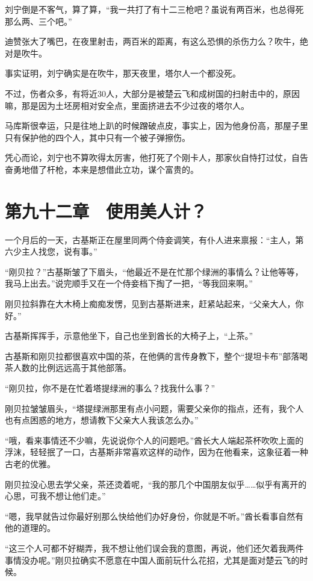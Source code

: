 刘宁倒是不客气，算了算，“我一共打了有十二三枪吧？虽说有两百米，也总得死那么两、三个吧。”

迪赞张大了嘴巴，在夜里射击，两百米的距离，有这么恐惧的杀伤力么？吹牛，绝对是吹牛。

事实证明，刘宁确实是在吹牛，那天夜里，塔尔人一个都没死。

不过，伤者众多，有将近30人，大部分是被楚云飞和成树国的扫射击中的，原因嘛，那是因为土坯房相对安全点，里面挤进去不少过夜的塔尔人。

马库斯很幸运，只是往地上趴的时候蹭破点皮，事实上，因为他身份高，那屋子里只有保护他的四个人，其中只有一个被子弹擦伤。

凭心而论，刘宁也不算吹得太厉害，他打死了个刚卡人，那家伙自恃打过仗，自告奋勇地借了杆枪，本来是想借此立功，谋个富贵的。

\section{第九十二章　使用美人计？}

一个月后的一天，古基斯正在屋里同两个侍妾调笑，有仆人进来禀报：“主人，第六少主人找您，说有事。”

“刚贝拉？”古基斯皱了下眉头，“他最近不是在忙那个绿洲的事情么？让他等等，我马上出去。”说完顺手又在一个侍妾档下掏了一把，“等我回来啊。”

刚贝拉斜靠在大木椅上痴痴发愣，见到古基斯进来，赶紧站起来，“父亲大人，你好。”

古基斯挥挥手，示意他坐下，自己也坐到酋长的大椅子上，“上茶。”

古基斯和刚贝拉都很喜欢中国的茶，在他俩的言传身教下，整个“提坦卡布”部落喝茶人数的比例远远高于其他部落。

“刚贝拉，你不是在忙着塔提绿洲的事么？找我什么事？”

刚贝拉皱皱眉头，“塔提绿洲那里有点小问题，需要父亲你的指点，还有，我个人也有点困惑的地方，想请教下父亲大人我该怎么办。”

“哦，看来事情还不少嘛，先说说你个人的问题吧。”酋长大人端起茶杯吹吹上面的浮沫，轻轻抿了一口，古基斯非常喜欢这样的动作，因为在他看来，这象征着一种古老的优雅。

刚贝拉没心思去学父亲，茶还烫着呢，“我的那几个中国朋友似乎……似乎有离开的心思，可我不想让他们走。”

“嗯，我早就告过你最好别那么快给他们办好身份，你就是不听。”酋长看事自然有他的道理的。

“这三个人可都不好糊弄，我不想让他们误会我的意图，再说，他们还欠着我两件事情没办呢。”刚贝拉确实不愿意在中国人面前玩什么花招，尤其是面对楚云飞的时候。

